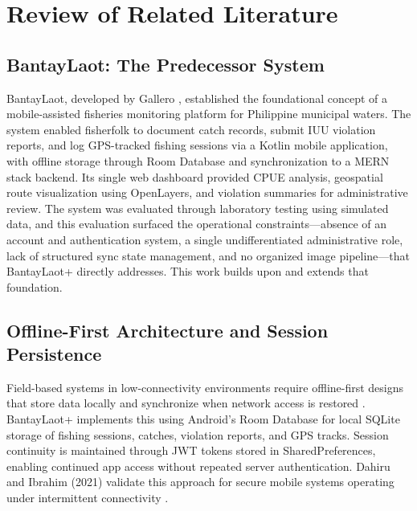 \documentclass[journal]{IEEEtran}
\begin{document}

\section{Review of Related Literature}

\subsection{BantayLaot: The Predecessor System}

BantayLaot, developed by Gallero \cite{Gallero2025}, established the foundational
concept of a mobile-assisted fisheries monitoring platform for Philippine municipal
waters. The system enabled fisherfolk to document catch records, submit IUU violation
reports, and log GPS-tracked fishing sessions via a Kotlin mobile application, with
offline storage through Room Database and synchronization to a MERN stack backend.
Its single web dashboard provided CPUE analysis, geospatial route visualization using
OpenLayers, and violation summaries for administrative review. The system was evaluated
through laboratory testing using simulated data, and this evaluation surfaced the
operational constraints---absence of an account and authentication system, a single
undifferentiated administrative role, lack of structured sync state management, and no
organized image pipeline---that BantayLaot+ directly addresses. This work builds upon
and extends that foundation.

\subsection{Offline-First Architecture and Session Persistence}

Field-based systems in low-connectivity environments require offline-first designs that
store data locally and synchronize when network access is restored \cite{Serrano2020}.
BantayLaot+ implements this using Android's Room Database for local SQLite storage of
fishing sessions, catches, violation reports, and GPS tracks. Session continuity is maintained through JWT tokens stored in SharedPreferences,
enabling continued app access without repeated server authentication. Dahiru and Ibrahim (2021) validate this
approach for secure mobile systems operating under intermittent connectivity
\cite{Dahiru2021}.
\end{document}

